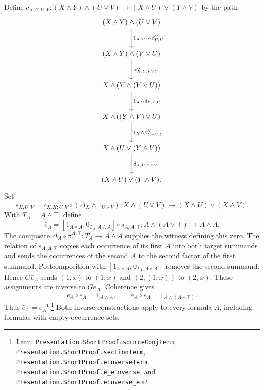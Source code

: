 \documentclass[11pt]{article}
\begin{document}
Define $c_{X,Y;U,V}:(X\wedge Y)\wedge(U\vee V)
\to(X\wedge U)\vee(Y\wedge V)$ by the path
\[
\begin{tikzcd}[row sep=large]
 (X\wedge Y)\wedge(U\vee V)
   \arrow[d,"{1_{X\wedge Y}\wedge\beta^\vee_{U,V}}"]\\
 (X\wedge Y)\wedge(V\vee U)
   \arrow[d,"{\alpha^\wedge_{X,Y,V\vee U}}"]\\
 X\wedge(Y\wedge(V\vee U))
   \arrow[d,"{1_X\wedge d_{Y,V,U}}"]\\
 X\wedge((Y\wedge V)\vee U)
   \arrow[d,"{1_X\wedge\beta^\vee_{Y\wedge V,U}}"]\\
 X\wedge(U\vee(Y\wedge V))
   \arrow[d,"{d_{X,U,Y\wedge V}}"]\\
 (X\wedge U)\vee(Y\wedge V).
\end{tikzcd}
\]
Set
\[
 s_{X,U,V}=c_{X,X;U,V}\circ(\Delta_X\wedge1_{U\vee V}):
 X\wedge(U\vee V)\longrightarrow(X\wedge U)\vee(X\wedge V).
\]
With $T_A=A\wedge\top$, define
\[
 \bar e_A=[1_{A\wedge A},0_{T_A,A\wedge A}]
                 \circ s_{A,A,\top}:
 A\wedge(A\vee\top)\longrightarrow A\wedge A.
\]
The composite $\Delta_A\circ\pi_1^{A,\top}:T_A\to A\wedge A$
supplies the witness defining this zero.
The relation of $s_{A,A,\top}$ copies each occurrence of its
first $A$ into both target summands and sends the occurrences
of the second $A$ to the second factor of the first summand.
Postcomposition with $[1_{A\wedge A},0_{T_A,A\wedge A}]$
removes the second summand. Hence $G\bar e_A$ sends
$(1,x)$ to $(1,x)$ and $(2,(1,x))$ to $(2,x)$.
These assignments are inverse to $Ge_A$. Coherence gives
\[
 \bar e_A\circ e_A=1_{A\wedge A},\qquad
 e_A\circ\bar e_A=1_{A\wedge(A\vee\top)}.
\]
Thus $\bar e_A=e_A^{-1}$.\footnote{\raggedright Lean:
\href{https://github.com/flengyel/Dosen-Petric-Maximality/blob/dosen-petric-v25-palomar-v3/DosenPetric/PresentationShortE.lean\#L13}{\texttt{Presentation.ShortProof.\allowbreak{}sourceConjTerm}},
\href{https://github.com/flengyel/Dosen-Petric-Maximality/blob/dosen-petric-v25-palomar-v3/DosenPetric/PresentationShortE.lean\#L21}{\texttt{Presentation.ShortProof.\allowbreak{}sectionTerm}},
\href{https://github.com/flengyel/Dosen-Petric-Maximality/blob/dosen-petric-v25-palomar-v3/DosenPetric/PresentationShortE.lean\#L30}{\texttt{Presentation.ShortProof.\allowbreak{}eInverseTerm}},
\href{https://github.com/flengyel/Dosen-Petric-Maximality/blob/dosen-petric-v25-palomar-v3/DosenPetric/PresentationShortE.lean\#L44}{\texttt{Presentation.ShortProof.\allowbreak{}e\_eInverse}}, and
\href{https://github.com/flengyel/Dosen-Petric-Maximality/blob/dosen-petric-v25-palomar-v3/DosenPetric/PresentationShortE.lean\#L50}{\texttt{Presentation.ShortProof.\allowbreak{}eInverse\_e}}.}
Both inverse constructions apply to every formula $A$, including
formulas with empty occurrence sets.
\end{document}
